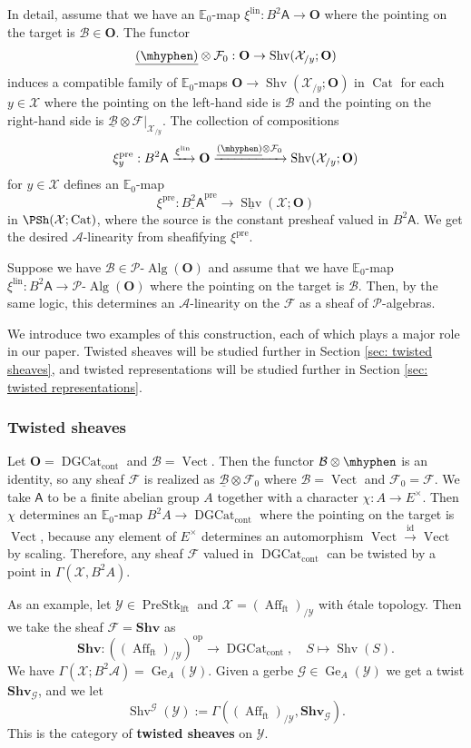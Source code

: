 \documentclass[10pt]{amsart}
\newcommand{\sssec}{\subsubsection}
\theoremstyle{remark}
\newcommand{\ul}{\underline}
\newcommand{\E}{\mathbb{E}}
\newcommand{\cP}{\mathcal{P}}
\newcommand{\on}{\operatorname}
\newcommand{\cA}{\mathcal{A}}
\newcommand{\cB}{\mathcal{B}}
\newcommand{\cF}{\mathcal{F}}
\newcommand{\cG}{\mathcal{G}}
\newcommand{\cX}{\mathcal{X}}
\newcommand{\cY}{\mathcal{Y}}
\newcommand{\Cat}{\on{Cat}}
\newcommand{\DGcat}{\on{DGCat}_{\on{cont}}}
\newcommand{\lAlg}{\text{-}\on{Alg}}
\newcommand{\Vect}{\on{Vect}}
\newcommand{\Shv}{\on{Shv}}
\newcommand{\PreStklft}{\on{PreStk}_{\on{lft}}}
\newcommand{\Affft}{\on{Aff}_{\on{ft}}}
\DeclareMathOperator{\op}{op}
\newcommand{\id}{\on{id}}
\newcommand{\bO}{\mathbf{O}}
\newcommand{\sfA}{\mathsf{A}}
\begin{document}
In detail, assume that we have an $\E_0$-map $\xi^{\on{lin}}:B^2\sfA\rightarrow \bO$ where the pointing on the target is $\cB\in\bO$. The functor
\[\ul{(\mhyphen)}\otimes \cF_0: \bO\rightarrow \Shv(\cX_{/y};\bO)\]
induces a compatible family of $\E_0$-maps $\bO\rightarrow \Shv(\cX_{/y};\bO)$ in $\Cat$
for each $y\in\cX$ where the pointing on the left-hand side is $\cB$ and the pointing on the right-hand side is $\ul{\cB}\otimes \cF|_{\cX_{/y}}$. The collection of compositions
\[\xi^{\on{pre}}_y:B^2 \sfA\xrightarrow{\xi^{\on{lin}}} \bO\xrightarrow{\ul{(\mhyphen)}\otimes\cF_0} \Shv(\cX_{/ y};\bO)\]
for $y\in \cX$ defines an $\E_0$-map
\[\xi^{\on{pre}}:\ul{B^2\sfA}^{\on{pre}}\rightarrow \ul{\Shv}(\cX;\bO)\]
in $\PSh(\cX;\Cat)$, where the source is the constant presheaf valued in $B^2 \sfA$. We get the desired $\cA$-linearity from sheafifying $\xi^{\on{pre}}$.
\medskip

 Suppose we have $\cB\in\cP\lAlg(\bO)$ and assume that we have $\E_0$-map $\xi^{\on{lin}}:B^2\sfA\rightarrow \cP\lAlg(\bO)$ where the pointing on the target is $\cB$. Then, by the same logic, this determines an $\cA$-linearity on the $\cF$ as a sheaf of $\cP$-algebras.
\medskip

We introduce two examples of this construction, each of which plays a major role in our paper. Twisted sheaves will be studied further in Section \ref{sec: twisted sheaves}, and twisted representations will be studied further in Section \ref{sec: twisted representations}.

\sssec{Twisted sheaves}\label{sssec: twisted sheaves}
    Let $\bO=\DGcat$ and $\cB=\Vect$. Then the functor $\cB\otimes \mhyphen$ is an identity, so any sheaf $\cF$ is realized as $\ul{\cB}\otimes \cF_0$ where $\cB=\Vect$ and $\cF_0=\cF$. We take $\sfA$ to be a finite abelian group $A$ together with a character $\chi:A\rightarrow E^{\times}$. Then $\chi$ determines an $\E_0$-map $B^2 A\rightarrow \DGcat$ where the pointing on the target is $\Vect$, because any element of $E^{\times}$ determines an automorphism $\Vect\xrightarrow{\id}\Vect$ by scaling. Therefore, any sheaf $\cF$ valued in $\DGcat$ can be twisted by a point in $\Gamma(\cX,B^2 A)$.
\medskip

As an example, let $\cY\in \PreStklft$ and $\cX=(\Affft)_{/\cY}$ with \'etale topology. Then we take the sheaf $\cF=\mathbf{Shv}$ as
\begin{equation}\label{eq: bold Shv}
    \mathbf{Shv}:\left((\Affft)_{/\cY}\right)^{\op}\rightarrow \DGcat,\quad S\mapsto \Shv(S).
\end{equation}
We have $\Gamma(\cX;B^2\cA)=\on{Ge}_A(\cY)$.
Given a gerbe $\cG\in \on{Ge}_A(\cY)$ we get a twist $\mathbf{Shv}_{\cG}$, and we let
\[\Shv^{\cG}(\cY):=\Gamma((\Affft)_{/\cY}, \mathbf{Shv}_{\cG}).\]
This is the category of \textbf{twisted sheaves} on $\cY$.
\medskip
\end{document}

